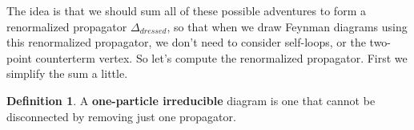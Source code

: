 \documentclass{report}
\theoremstyle{plain}
\theoremstyle{definition}
\newtheorem{definition}[theorem]{Definition}
\theoremstyle{remark}
\begin{document}
\begin{center}
\begin{minipage}{0.3\textwidth}
  \end{minipage}
\end{center}
The idea is that we should sum all of these possible adventures to
form a renormalized propagator $\Delta_{dressed}$, so that when we
draw Feynman diagrams using this renormalized propagator, we don't
need to consider self-loops, or the two-point counterterm vertex. So
let's compute the renormalized propagator. First we simplify the sum a
little.

\begin{definition}
  A {\bf one-particle irreducible} diagram is one that cannot be
  disconnected by removing just one propagator.
\end{definition}
\end{document}
